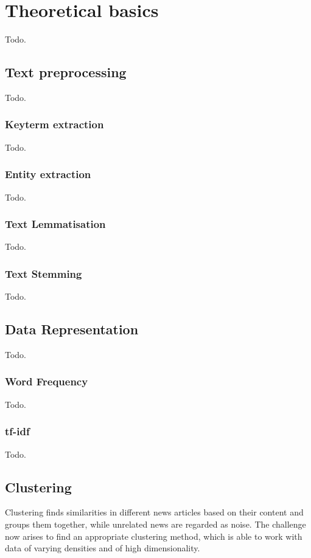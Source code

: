 \section{Theoretical basics}
Todo.

\subsection{Text preprocessing}
Todo.

\subsubsection{Keyterm extraction}
Todo.

\subsubsection{Entity extraction}
Todo.

\subsubsection{Text Lemmatisation}
Todo.

\subsubsection{Text Stemming}
Todo.

\subsection{Data Representation}
Todo.

\subsubsection{Word Frequency}
Todo.

\subsubsection{tf-idf}
Todo.

\subsection{Clustering}
Clustering finds similarities in different news articles based on their content and groups them together,
while unrelated news are regarded as noise.
The challenge now arises to find an appropriate clustering method,
which is able to work with data of varying densities and of high dimensionality.

